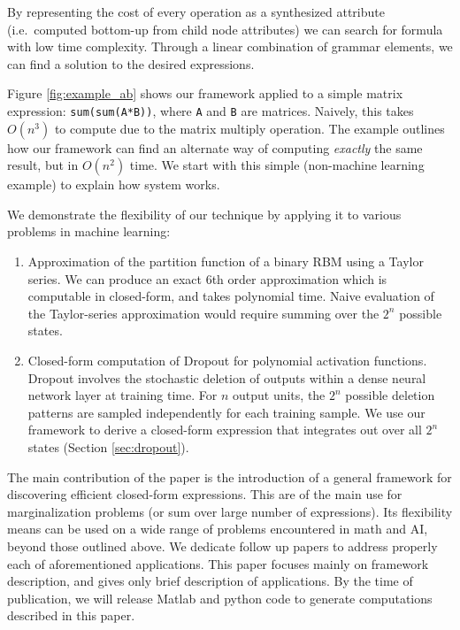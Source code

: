 \noindent
By representing the cost of every operation as a synthesized attribute
(i.e.~computed bottom-up from child node attributes) we can search for
formula with low time complexity. Through a linear combination of
grammar elements, we can find a solution to the desired
expressions. 



Figure \ref{fig:example_ab} shows our framework applied to a simple matrix expression:
\texttt{sum(sum(A*B))}, where \texttt{A} and \texttt{B} are matrices. Naively, this takes $O(n^3)$ to compute due to
the matrix multiply operation. The example outlines how our framework
can find an alternate way of computing {\em exactly} the same result,
but in $O(n^2)$ time. We start with this simple (non-machine learning example) to
explain how system works.

We demonstrate the flexibility of our technique by applying it to 
various problems in machine learning: 
\begin{enumerate}
\vspace{-2mm}
\item Approximation of the partition function of a binary RBM using a
  Taylor series. We can produce an exact 6th order 
  approximation which is
  computable in closed-form, and takes polynomial time.
  Naive evaluation of the Taylor-series
  approximation would require summing over the $2^n$ possible states.   
\item Closed-form computation of Dropout for polynomial activation functions. 
  Dropout \cite{hinton2012improving}
  involves the  stochastic deletion of outputs within a dense neural
  network layer at training time. For $n$ output units, the $2^n$
  possible deletion patterns are sampled independently for each
  training sample. We use our framework to derive a closed-form
  expression that integrates out over all $2^n$ states (Section \ref{sec:dropout}).
\end{enumerate}
\vspace{-2mm}

The main contribution of the paper is the introduction of a general
framework for discovering efficient closed-form expressions. This are
of the main use for marginalization problems (or sum over large number of
expressions). Its
flexibility means can be used on a wide range of problems encountered
in math and AI, beyond those outlined above. We dedicate follow up 
papers to address properly each of aforementioned applications. This
paper focuses mainly on framework description, and gives only brief description
of applications. By the time of publication, we will release Matlab and python
code to generate computations described in this paper.

